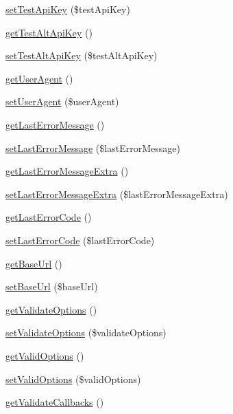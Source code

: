 \begin{DoxyCompactItemize}
\item 
\hyperlink{classCPSApiComponent_a727ba895de76d3d82a09ae68b7f7424a}{setTestApiKey} (\$testApiKey)
\item 
\hyperlink{classCPSApiComponent_a80a2273fea0b94d8b50776e5b1d8366a}{getTestAltApiKey} ()
\item 
\hyperlink{classCPSApiComponent_a5dc9200ce16ea1d68df29cc6023c7481}{setTestAltApiKey} (\$testAltApiKey)
\item 
\hyperlink{classCPSApiComponent_a48e8658a82c25e220a9524c1f1a42d5d}{getUserAgent} ()
\item 
\hyperlink{classCPSApiComponent_ac3abfe8b343b4a2f8cd3ff90d9df92f7}{setUserAgent} (\$userAgent)
\item 
\hyperlink{classCPSApiComponent_a618ddc8b1edcb086ac15d5eee6cc4bd8}{getLastErrorMessage} ()
\item 
\hyperlink{classCPSApiComponent_a4b7bfa4ad702defa357b91872fd46bb2}{setLastErrorMessage} (\$lastErrorMessage)
\item 
\hyperlink{classCPSApiComponent_a1e5c3953744539e1a72dbacf736ba070}{getLastErrorMessageExtra} ()
\item 
\hyperlink{classCPSApiComponent_aa62061474c16981360340ba8cfdac640}{setLastErrorMessageExtra} (\$lastErrorMessageExtra)
\item 
\hyperlink{classCPSApiComponent_aeb3d06b62e5222903e9324435c198ca3}{getLastErrorCode} ()
\item 
\hyperlink{classCPSApiComponent_aa770aa5608fb4f4c43a1b2785cd48208}{setLastErrorCode} (\$lastErrorCode)
\item 
\hyperlink{classCPSApiComponent_ae1ca0d2444e3cca6b147445348f686de}{getBaseUrl} ()
\item 
\hyperlink{classCPSApiComponent_a6acd31b61e7897fdf8983d355f4f7c07}{setBaseUrl} (\$baseUrl)
\item 
\hyperlink{classCPSApiComponent_a0213d6968c9e90b0c9d00074f45185a0}{getValidateOptions} ()
\item 
\hyperlink{classCPSApiComponent_abe9696fbc0a4b90eda4bb16d3c2cfddc}{setValidateOptions} (\$validateOptions)
\item 
\hyperlink{classCPSApiComponent_a4c78203139d38f02a2bc24a44ee488b2}{getValidOptions} ()
\item 
\hyperlink{classCPSApiComponent_a667a9bae9525352a2f5e784d59043a4c}{setValidOptions} (\$validOptions)
\item 
\hyperlink{classCPSApiComponent_ad95c12afcd8d0e4643517c58fd1d5db5}{getValidateCallbacks} ()
\item 

\end{DoxyCompactItemize}
